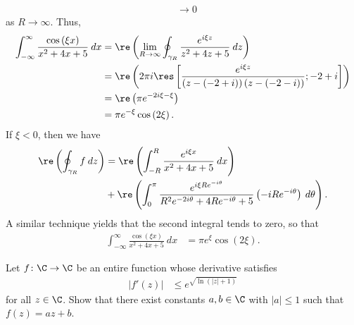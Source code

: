 \documentclass[10pt]{mypackage}
\begin{document}
\begin{solution}
\begin{align*}
                                                                                                                                           &\rightarrow 0
  \end{align*}
  as $R\rightarrow\infty$. Thus,
  \begin{align*}
    \int_{-\infty}^{\infty} \frac{\cos\left( \xi x \right)}{x^2 + 4x +5}\:dx &= \re\left( \lim_{R\rightarrow\infty} \oint_{\gamma_R}^{} \frac{e^{i\xi z}}{z^2 + 4z + 5}\:dz \right)\\
                                                                             &= \re\left( 2\pi i \res\left[ \frac{e^{i\xi z}}{\left( z-\left( -2 + i \right) \right)\left( z-\left( -2-i \right) \right)};-2 + i \right] \right)\\
                                                                             &= \re\left( \pi e^{-2i\xi - \xi} \right)\\
                                                                             &= \pi e^{-\xi}\cos\left( 2\xi \right).
  \end{align*}
  If $\xi < 0$, then we have
  \begin{align*}
    \re\left( \oint_{\gamma_R}^{} f\:dz \right) &= \re\left( \int_{-R}^{R} \frac{e^{i\xi x}}{x^2 + 4x + 5}\:dx \right) \\
                                                &+ \re\left( \int_{0}^{\pi} \frac{e^{i\xi Re^{-i\theta}}}{R^2e^{-2i\theta} + 4Re^{-i\theta} + 5} \left( -iRe^{-i\theta} \right)\:d\theta \right).
  \end{align*}
  A similar technique yields that the second integral tends to zero, so that
  \begin{align*}
    \int_{-\infty}^{\infty} \frac{\cos\left( \xi x \right)}{x^2 + 4x + 5}\:dx &= \pi e^{\xi}\cos\left( 2\xi \right).
  \end{align*}
\end{solution}
\begin{problem}[Problem 2]
  Let $f\colon \C\rightarrow \C$ be an entire function whose derivative satisfies
  \begin{align*}
    \left\vert f'(z) \right\vert &\leq e^{\sqrt{\ln\left(\left\vert z \right\vert + 1\right)}}
  \end{align*}
  for all $z\in \C$. Show that there exist constants $a,b\in \C$ with $\left\vert a \right\vert\leq 1$ such that $f(z) = az + b$.
\end{problem}
\end{document}
